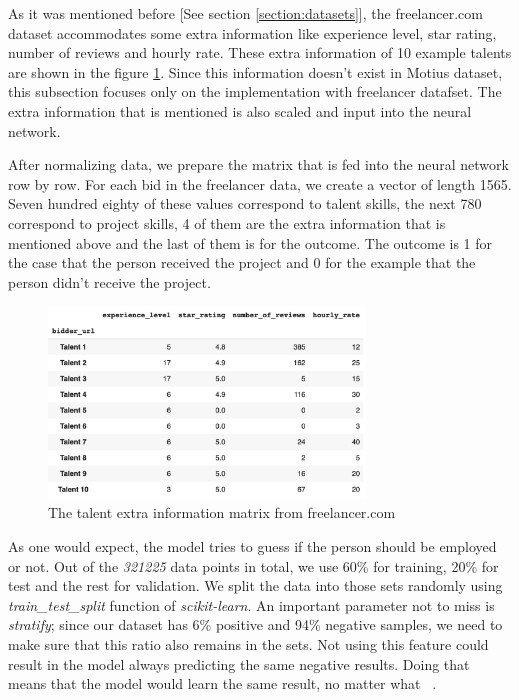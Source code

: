As it was mentioned before [See section \ref{section:datasets}], the freelancer.com dataset accommodates some extra information like experience level, star rating, number of reviews and hourly rate. These extra information of 10 example talents are shown in the figure \ref{fig:freelancer-talent-meta}. Since this information doesn't exist in Motius dataset, this subsection focuses only on the implementation with freelancer datafset. The extra information that is mentioned is also scaled and input into the neural network. 


After normalizing data, we prepare the matrix that is fed into the neural network row by row. For each bid in the freelancer data, we create a vector of length 1565. Seven hundred eighty of these values correspond to talent skills, the next 780 correspond to project skills, 4 of them are the extra information that is mentioned above and the last of them is for the outcome. The outcome is 1 for the case that the person received the project and 0 for the example that the person didn't receive the project.



\begin{figure}[!ht]
	\centering
	\includegraphics[width=0.75\textwidth]{figures/FreelancerTalentMeta.png}
	\caption{The talent extra information matrix from freelancer.com}
	\label{fig:freelancer-talent-meta}
\end{figure}

As one would expect, the model tries to guess if the person should be employed or not. Out of the \textit{321225} data points in total, we use 60\% for training, 20\% for test and the rest for validation. We split the data into those sets randomly using \textit{train\_test\_split} function of \textit{scikit-learn}. An important parameter not to miss is \textit{stratify}; since our dataset has  6\% positive and 94\% negative samples, we need to make sure that this ratio also remains in the sets. Not using this feature could result in the model always predicting the same negative results. Doing that means that the model would learn the same result, no matter what ~\parencite{singh2015survey}.

